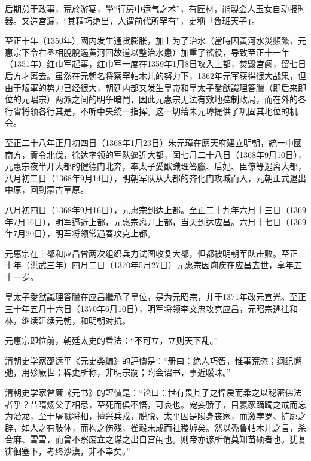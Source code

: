 后期怠于政事，荒於游宴，學“行房中运气之术”，有匠材，能製金人玉女自动报时器。又造宫漏，“其精巧绝出，人谓前代所罕有”，史稱「魯班天子」。

至正十年（1350年）國内发生通货膨胀，加上为了治水（當時因黃河水災頻繁，元惠宗下令右丞相脫脫遏黄河回故道以整治水患）加重了徭役，导致至正十一年（1351年）红巾军起事，红巾军一度在1359年1月8日攻入上都，焚毁宫阙，留七日后方才离去。虽然在元朝名将察罕帖木儿的努力下，1362年元军获得很大战果，但由于叛軍的势力已经很大，朝廷内部又发生皇帝和皇太子愛猷識理答臘（即后来即位的元昭宗）两派之间的明争暗鬥，因此元惠宗无法有效地控制政局，而在外的各行省将领各行其是，不听中央统一指挥。这一切给朱元璋提供了巩固其地位的机会。

至正二十八年正月初四日（1368年1月23日）朱元璋在應天府建立明朝，統一中國南方，責令北伐，徐达率领的军队逼近大都，闰七月二十八日（1368年9月10日），元惠宗夜半开大都的健德门北奔，率太子愛猷識理答臘、后妃、臣僚等逃离大都，八月初二日（1368年9月14日），明朝军队从大都的齐化门攻城而入，元朝正式退出中原，回到蒙古草原。

八月初四日（1368年9月16日），元惠宗到达上都。至正二十九年六月十三日（1369年7月16日），明军逼近上都，元惠宗离开上都，当天到达应昌。六月十七日（1369年7月20日），明军将领常遇春攻克上都。

元惠宗在上都和应昌曾两次组织兵力试图收复大都，但都被明朝军队击败。至正三十年（洪武三年）四月二日（1370年5月27日）元惠宗因痢疾在应昌去世，享年五十一岁。

皇太子愛猷識理答臘在应昌繼承了皇位，是为元昭宗，并于1371年改元宣光。至正三十年五月十六日（1370年6月10日），明军将领李文忠攻克应昌，元昭宗逃往和林，继续延续元朝，和明朝对抗。

元惠宗即位前，朝廷太史的看法：“不可立，立则天下乱。”

清朝史学家邵远平《元史类编》的評價是：“册曰：绝人巧智，惟事荒恣；纲纪懈弛，用殄厥世；稗史所称，非明宗嗣；附会诏书，事近暧昧。”

清朝史学家曾廉《元书》的評價是：“论曰：世有畏其子之悍戾而柔之以秘密佛法者乎？昔隋炀父子相忌，至死而俱不悟，可哀也。宠妾骄子，目羸豕蹢躅之戒而忘为潜龙，至于屠戮将相，擅兴兵戎，脱脱、太平因是陨身丧家，而激孛罗、扩廓之辟，如人之有肢体，而构之伤残，雀彀未成而社稷墟矣。然以秃鲁帖木儿之言，杀合麻、雪雪，而曾不察废立之谋之出自宫闱也。则帝亦谚所谓莫知苗硕者也。犹复徘徊塞下，考终沙漠，非不幸矣。”

